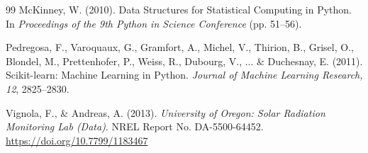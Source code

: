 \documentclass[12pt]{article}
\begin{document}
\begin{thebibliography}{99}
McKinney, W. (2010). Data Structures for Statistical Computing in Python. In \textit{Proceedings of the 9th Python in Science Conference} (pp. 51--56).

Pedregosa, F., Varoquaux, G., Gramfort, A., Michel, V., Thirion, B., Grisel, O., Blondel, M., Prettenhofer, P., Weiss, R., Dubourg, V., ... \& Duchesnay, E. (2011). Scikit-learn: Machine Learning in Python. \textit{Journal of Machine Learning Research, 12}, 2825--2830.

Vignola, F., \& Andreas, A. (2013). \textit{University of Oregon: Solar Radiation Monitoring Lab (Data)}. NREL Report No. DA-5500-64452. \url{https://doi.org/10.7799/1183467}

\end{thebibliography}
\end{document}
